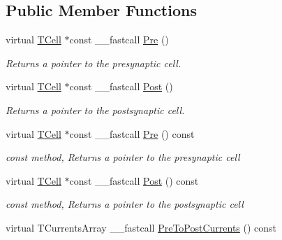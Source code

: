 \subsection*{Public Member Functions}
\begin{DoxyCompactItemize}
\item 
\hypertarget{class_t_synapse_afad89e3fd2091900a4e1dc9bc307a694}{virtual \hyperlink{class_t_cell}{T\+Cell} $\ast$const \+\_\+\+\_\+fastcall \hyperlink{class_t_synapse_afad89e3fd2091900a4e1dc9bc307a694}{Pre} ()}\label{class_t_synapse_afad89e3fd2091900a4e1dc9bc307a694}

\begin{DoxyCompactList}\small\item\em Returns a pointer to the presynaptic cell. \end{DoxyCompactList}\item 
\hypertarget{class_t_synapse_a358060ab1845a817039d3611fe886743}{virtual \hyperlink{class_t_cell}{T\+Cell} $\ast$const \+\_\+\+\_\+fastcall \hyperlink{class_t_synapse_a358060ab1845a817039d3611fe886743}{Post} ()}\label{class_t_synapse_a358060ab1845a817039d3611fe886743}

\begin{DoxyCompactList}\small\item\em Returns a pointer to the postsynaptic cell. \end{DoxyCompactList}\item 
\hypertarget{class_t_synapse_a833dfae5d5c3f928fed3329f6cb02267}{virtual \hyperlink{class_t_cell}{T\+Cell} $\ast$const \+\_\+\+\_\+fastcall \hyperlink{class_t_synapse_a833dfae5d5c3f928fed3329f6cb02267}{Pre} () const }\label{class_t_synapse_a833dfae5d5c3f928fed3329f6cb02267}

\begin{DoxyCompactList}\small\item\em const method, Returns a pointer to the presynaptic cell \end{DoxyCompactList}\item 
\hypertarget{class_t_synapse_a6b1e9466948359d9d16bd886c73a171c}{virtual \hyperlink{class_t_cell}{T\+Cell} $\ast$const \+\_\+\+\_\+fastcall \hyperlink{class_t_synapse_a6b1e9466948359d9d16bd886c73a171c}{Post} () const }\label{class_t_synapse_a6b1e9466948359d9d16bd886c73a171c}

\begin{DoxyCompactList}\small\item\em const method, Returns a pointer to the postsynaptic cell \end{DoxyCompactList}\item 
\hypertarget{class_t_synapse_abf23c375476cac34b7cd90f79179b614}{virtual T\+Currents\+Array \+\_\+\+\_\+fastcall \hyperlink{class_t_synapse_abf23c375476cac34b7cd90f79179b614}{Pre\+To\+Post\+Currents} () const }\label{class_t_synapse_abf23c375476cac34b7cd90f79179b614}


\end{DoxyCompactItemize}
